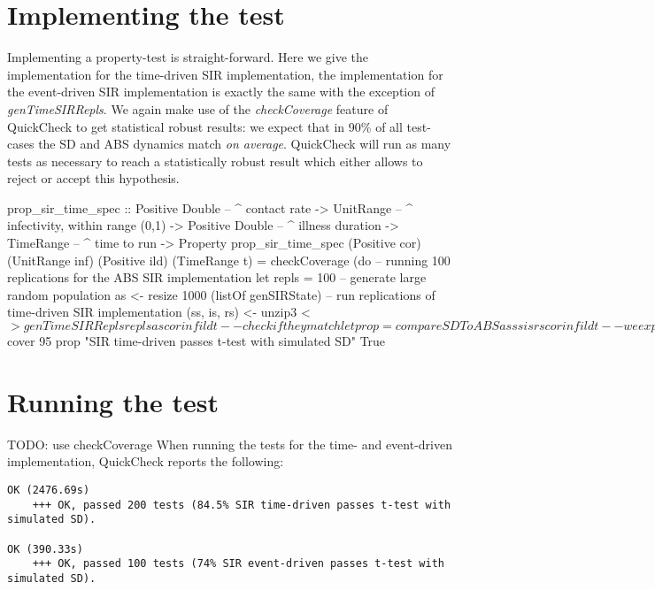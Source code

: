 \section{Implementing the test}
Implementing a property-test is straight-forward. Here we give the implementation for the time-driven SIR implementation, the implementation for the event-driven SIR implementation is exactly the same with the exception of \textit{genTimeSIRRepls}. We again make use of the \textit{checkCoverage} feature of QuickCheck to get statistical robust results: we expect that in 90\% of all test-cases the SD and ABS dynamics match \textit{on average}. QuickCheck will run as many tests as necessary to reach a statistically robust result which either allows to reject or accept this hypothesis.

\begin{HaskellCode}
prop_sir_time_spec :: Positive Double  -- ^ contact rate
                   -> UnitRange        -- ^ infectivity, within range (0,1)
                   -> Positive Double  -- ^ illness duration
                   -> TimeRange        -- ^ time to run
                   -> Property
prop_sir_time_spec 
    (Positive cor) (UnitRange inf) (Positive ild) (TimeRange t) = checkCoverage (do
  -- running 100 replications for the ABS SIR implementation
  let repls = 100
  -- generate large random population
  as <- resize 1000 (listOf genSIRState)
  -- run replications of time-driven SIR implementation
  (ss, is, rs) <- unzip3 <$> genTimeSIRRepls repls as cor inf ild t
  -- check if they match 
  let prop = compareSDToABS as ss is rs cor inf ild t
  -- we expect 95%
  return $ cover 95 prop "SIR time-driven passes t-test with simulated SD" True
\end{HaskellCode}

\section{Running the test}
TODO: use checkCoverage
When running the tests for the time- and event-driven implementation, QuickCheck reports the following:

\begin{verbatim}
OK (2476.69s)
    +++ OK, passed 200 tests (84.5% SIR time-driven passes t-test with simulated SD).
    
OK (390.33s)
    +++ OK, passed 100 tests (74% SIR event-driven passes t-test with simulated SD).
\end{verbatim}

